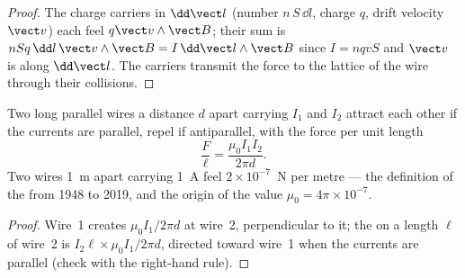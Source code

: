 \begin{proof}
The charge carriers in $\dd\vect l$ (number $n\,S\,\dd l$, charge $q$,
drift velocity $\vect v$) each feel $q\vect v\wedge\vect B$; their sum is
$nSq\,\dd l\,\vect v\wedge\vect B = I\,\dd\vect l\wedge\vect B$ since $I = nqvS$
and $\vect v$ is along $\dd\vect l$. The carriers transmit the force to the
lattice of the wire through their collisions.
\end{proof}

\begin{proposition}\label{prop:b1:magnetostatics:parallel}
Two long parallel wires a distance $d$ apart carrying $I_1$ and $I_2$
attract each other if the currents are parallel, repel if antiparallel,
with the force per unit length
\[
\frac{F}{\ell} = \frac{\mu_0I_1I_2}{2\pi d} .
\]
Two wires \qty{1}{m} apart carrying \qty{1}{A} feel $2 \times 10^{-7}$~N per
metre --- the definition of the  from 1948 to 2019, and the
origin of the value $\mu_0 = 4\pi \times 10^{-7}$.
\end{proposition}

\begin{proof}
Wire~1 creates $\mu_0I_1/2\pi d$ at wire~2, perpendicular to it; the
 on a length $\ell$ of wire~2 is $I_2\ell \times \mu_0I_1/2\pi d$,
directed toward wire~1 when the currents are parallel (check with the
right-hand rule).
\end{proof}

